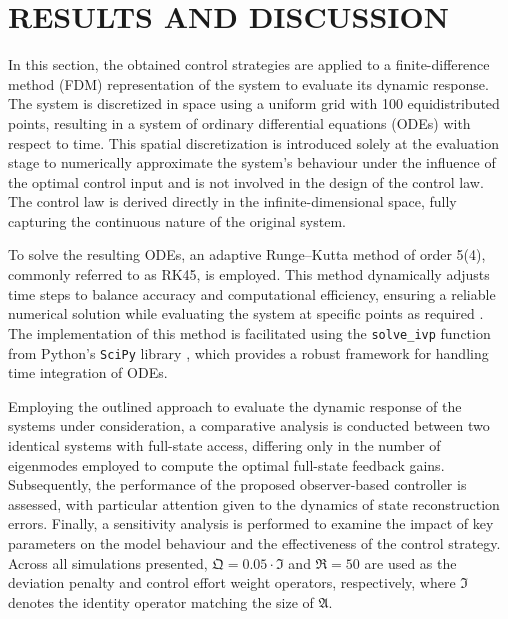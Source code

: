 \section{RESULTS AND DISCUSSION} \label{sec:results}

In this section, the obtained control strategies are applied to a finite-difference method (FDM) representation of the system to evaluate its dynamic response. The system is discretized in space using a uniform grid with 100 equidistributed points, resulting in a system of ordinary differential equations (ODEs) with respect to time. This spatial discretization is introduced solely at the evaluation stage to numerically approximate the system's behaviour under the influence of the optimal control input and is not involved in the design of the control law. The control law is derived directly in the infinite-dimensional space, fully capturing the continuous nature of the original system.

To solve the resulting ODEs, an adaptive Runge--Kutta method of order 5(4), commonly referred to as RK45, is employed. This method dynamically adjusts time steps to balance accuracy and computational efficiency, ensuring a reliable numerical solution while evaluating the system at specific points as required \autocite{RK45_1, RK45_2}. The implementation of this method is facilitated using the \texttt{solve\_ivp} function from Python's \texttt{SciPy} library \autocite{2020SciPy}, which provides a robust framework for handling time integration of ODEs.

Employing the outlined approach to evaluate the dynamic response of the systems under consideration, a comparative analysis is conducted between two identical systems with full-state access, differing only in the number of eigenmodes employed to compute the optimal full-state feedback gains. Subsequently, the performance of the proposed observer-based controller is assessed, with particular attention given to the dynamics of state reconstruction errors. Finally, a sensitivity analysis is performed to examine the impact of key parameters on the model behaviour and the effectiveness of the control strategy. Across all simulations presented, $\mathfrak{Q} = 0.05 \cdot \mathfrak{I}$ and $\mathfrak{R} = 50$ are used as the deviation penalty and control effort weight operators, respectively, where $\mathfrak{I}$ denotes the identity operator matching the size of $\mathfrak{A}$.


